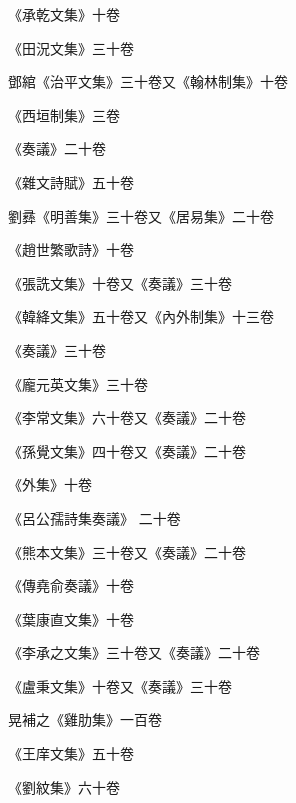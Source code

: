 \begin{pinyinscope}
 《承乾文集》十卷



 《田況文集》三十卷



 鄧綰《治平文集》三十卷又《翰林制集》十卷



 《西垣制集》三卷



 《奏議》二十卷



 《雜文詩賦》五十卷



 劉彞《明善集》三十卷又《居易集》二十卷



 《趙世繁歌詩》十卷



 《張詵文集》十卷又《奏議》三十卷



 《韓絳文集》五十卷又《內外制集》十三卷



 《奏議》三十卷



 《龐元英文集》三十卷



 《李常文集》六十卷又《奏議》二十卷



 《孫覺文集》四十卷又《奏議》二十卷



 《外集》十卷



 《呂公孺詩集奏議》
 二十卷



 《熊本文集》三十卷又《奏議》二十卷



 《傳堯俞奏議》十卷



 《葉康直文集》十卷



 《李承之文集》三十卷又《奏議》二十卷



 《盧秉文集》十卷又《奏議》三十卷



 晃補之《雞肋集》一百卷



 《王庠文集》五十卷



 《劉紋集》六十卷




\end{pinyinscope}
